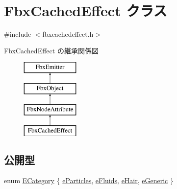 \hypertarget{class_fbx_cached_effect}{}\section{Fbx\+Cached\+Effect クラス}
\label{class_fbx_cached_effect}


{\ttfamily \#include $<$fbxcachedeffect.\+h$>$}

Fbx\+Cached\+Effect の継承関係図\begin{figure}[H]
\begin{center}
\leavevmode
\includegraphics[height=4.000000cm]{class_fbx_cached_effect}
\end{center}
\end{figure}
\subsection*{公開型}
\begin{DoxyCompactItemize}
\item 
enum \hyperlink{class_fbx_cached_effect_ab402402f3e66d6e31eb3002b0bd58c33}{E\+Category} \{ \hyperlink{class_fbx_cached_effect_ab402402f3e66d6e31eb3002b0bd58c33a671d67cb2612c88c7845ded1a00a2354}{e\+Particles}, 
\hyperlink{class_fbx_cached_effect_ab402402f3e66d6e31eb3002b0bd58c33acafbbfe4981b823c92ea36406118dd98}{e\+Fluids}, 
\hyperlink{class_fbx_cached_effect_ab402402f3e66d6e31eb3002b0bd58c33aabf5b111f5d739c2f4b0aba73a87c18e}{e\+Hair}, 
\hyperlink{class_fbx_cached_effect_ab402402f3e66d6e31eb3002b0bd58c33a301e356a3faecf6bea31b2ab220b3cf8}{e\+Generic}
 \}
\end{DoxyCompactItemize}
